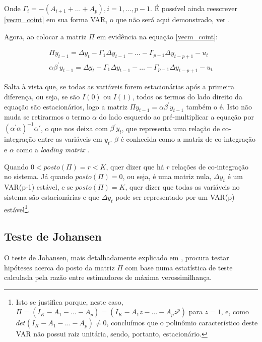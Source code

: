 \documentclass[a4paper,
               article,
               12pt,
               openany,
               oneside,
               english,
               brazil]{abntex2}
\numberwithin{equation}{section}
\begin{document}
   Onde $ \Gamma_i = -(A_{i+1} + \ldots + A_p), i = 1, \ldots, p-1 $. É possível ainda reescrever \eqref{vecm_coint} em sua forma VAR, o que não será aqui demonstrado, ver \cite[p.~248-249]{lutkepool}.

   Agora, ao colocar a matriz $ \Pi $ em evidência na equação \eqref{vecm_coint}:

   \begin{equation}
       \label{vecm_coint2}
       \begin{aligned}
       \Pi y_{t-1} = \Delta y_t - \Gamma_1 \Delta y_{t-1} - \ldots - \Gamma_{p-1} \Delta y_{t-p+1} - u_t \\
           \alpha \beta^{'} y_{t-1} = \Delta y_t - \Gamma_1 \Delta y_{t-1} - \ldots - \Gamma_{p-1} \Delta y_{t-p+1} - u_t
       \end{aligned}
   \end{equation}

   Salta à vista que, se todas as variáveis forem estacionárias após a primeira diferença, ou seja, se são $ I(0) $ ou $ I(1) $, todos os termos do lado direito da equação são estacionários, logo a matriz $ \Pi y_{t-1} = \alpha \beta^{'} y_{t-1} $ também o é. Isto não muda se retirarmos o termo $ \alpha $ do lado esquerdo ao pré-multiplicar a equação por $ (\alpha^{'}\alpha)^{-1}\alpha{'} $, o que nos deixa com $ \beta^{'}y_{t} $, que representa uma relação de co-integração entre as variáveis em $ y_t $. $ \beta $ é conhecida como a matriz de co-integração e $ \alpha $ como a \textit{loading matrix} \cite[p.~244-249]{lutkepool}.

   Quando $ 0 < posto(\Pi) = r < K $, quer dizer que há $ r $ relações de co-integração no sistema. Já quando $ posto(\Pi) = 0 $, ou seja, é uma matriz nula, $ \Delta y_t $ é um VAR(p-1) estável, e se $ posto(\Pi) = K $, quer dizer que todas as variáveis no sistema são estacionárias e que $ \Delta y_t $ pode ser representado por um VAR(p) estável\footnote{Isto se justifica porque, neste caso, $ \Pi = (I_K - A_1 - \ldots - A_p) = (I_K - A_1z - \ldots - A_pz^p) $ para $ z = 1 $, e, como $ det(I_K - A_1 - \ldots - A_p) \neq 0 $, concluímos que o polinômio característico deste VAR não possui raiz unitária, sendo, portanto, estacionário.}.

   \subsection{Teste de Johansen}

   O teste de Johansen, mais detalhadamente explicado em \textcite[p.~327-330]{lutkepool}, procura testar hipóteses acerca do posto da matriz $ \Pi $ com base numa estatística de teste calculada pela razão entre estimadores de máxima verossimilhança.
\end{document}
